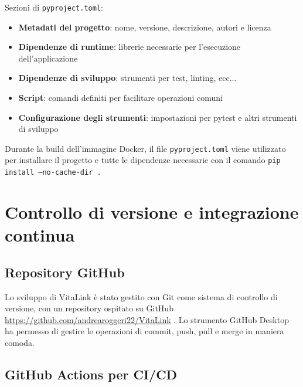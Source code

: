 \documentclass[12pt,a4paper,oneside]{report}
\begin{document}
Sezioni di \texttt{pyproject.toml}:

\begin{itemize}
    \item \textbf{Metadati del progetto}: nome, versione, descrizione, autori e licenza
    \item \textbf{Dipendenze di runtime}: librerie necessarie per l'esecuzione dell'applicazione
    \item \textbf{Dipendenze di sviluppo}: strumenti per test, linting, ecc...
    \item \textbf{Script}: comandi definiti per facilitare operazioni comuni
    \item \textbf{Configurazione degli strumenti}: impostazioni per pytest e altri strumenti di sviluppo
\end{itemize}

Durante la build dell'immagine Docker, il file \texttt{pyproject.toml} viene utilizzato per installare il progetto e tutte le dipendenze necessarie con il comando \texttt{pip install --no-cache-dir .}

\section{Controllo di versione e integrazione continua}
\subsection{Repository GitHub}
Lo sviluppo di VitaLink è stato gestito con Git come sistema di controllo di versione, con un repository ospitato su GitHub \url{https://github.com/andrearoggeri22/VitaLink} \cite{github}.
Lo strumento GitHub Desktop \cite{gitdesktop}ha permesso di gestire le operazioni di commit, push, pull e merge in maniera comoda.

\subsection{GitHub Actions per CI/CD}
\end{document}

